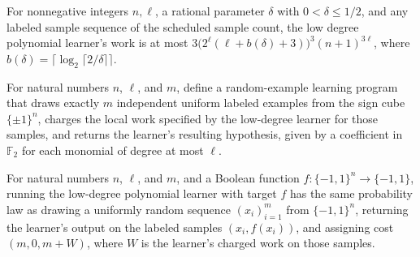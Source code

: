 \begin{theorem}
\leanok
{}
For nonnegative integers $n,\ell$, a rational parameter $\delta$ with $0<\delta\le 1/2$,
and any labeled sample sequence of the scheduled sample count, the low degree polynomial
learner's work is at most $3\bigl(2^\ell(\ell+b(\delta)+3)\bigr)^3(n+1)^{3\ell}$, where
$b(\delta)=\lceil\log_2\lceil2/\delta\rceil\rceil$.
\end{theorem}

\begin{definition}
\leanok
{}
For natural numbers $n$, $\ell$, and $m$, define a random-example learning program that
draws exactly $m$ independent uniform labeled examples from the sign cube $\{\pm1\}^n$,
charges the local work specified by the low-degree learner for those samples, and
returns the learner's resulting hypothesis, given by a coefficient in $\mathbb{F}_2$ for
each monomial of degree at most $\ell$.
\end{definition}

\begin{theorem}
\leanok
{}
For natural numbers $n$, $\ell$, and $m$, and a Boolean function
$f:\{−1,1\}^n\to\{−1,1\}$, running the low-degree polynomial learner with target $f$ has
the same probability law as drawing a uniformly random sequence $(x_i)_{i=1}^m$ from
$\{−1,1\}^n$, returning the learner’s output on the labeled samples $(x_i,f(x_i))$, and
assigning cost $(m,0,m+W)$, where $W$ is the learner’s charged work on those samples.
\end{theorem}

